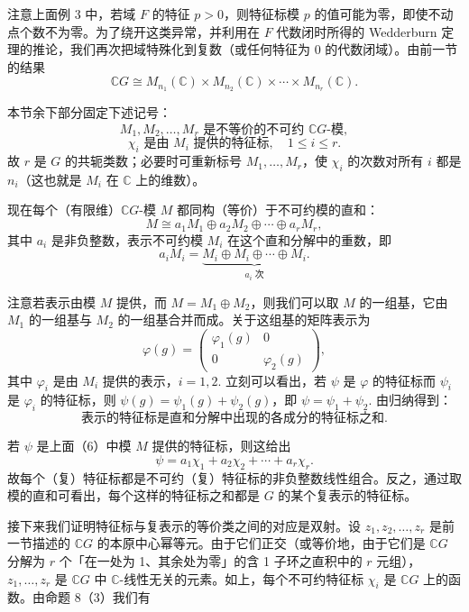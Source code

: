 注意上面例 3 中，若域 \(F\) 的特征 \(p > 0\)，则特征标模 \(p\) 的值可能为零，即使不动点个数不为零。为了绕开这类异常，并利用在 \(F\) 代数闭时所得的 Wedderburn 定理的推论，我们再次把域特殊化到复数（或任何特征为 0 的代数闭域）。由前一节的结果
\[
\mathbb{C}G \cong M_{n_1}(\mathbb{C}) \times M_{n_2}(\mathbb{C}) \times \cdots \times M_{n_r}(\mathbb{C}). \tag{18.4}
\]

本节余下部分固定下述记号：
\[
M_1, M_2, \ldots, M_r \text{ 是不等价的不可约 } \mathbb{C}G\text{-模}, \tag{18.5}
\]
\[
\chi_i \text{ 是由 } M_i \text{ 提供的特征标}, \quad 1 \leq i \leq r.
\]
故 \(r\) 是 \(G\) 的共轭类数；必要时可重新标号 \(M_1, \ldots, M_r\)，使 \(\chi_i\) 的次数对所有 \(i\) 都是 \(n_i\)（这也就是 \(M_i\) 在 \(\mathbb{C}\) 上的维数）。

现在每个（有限维）\(\mathbb{C}G\)-模 \(M\) 都同构（等价）于不可约模的直和：
\[
M \cong a_1M_1 \oplus a_2M_2 \oplus \cdots \oplus a_rM_r, \tag{18.6}
\]
其中 \(a_i\) 是非负整数，表示不可约模 \(M_i\) 在这个直和分解中的重数，即
\[
a_iM_i = \underbrace{M_i \oplus M_i \oplus \cdots \oplus M_i}_{a_i \text{ 次}}.
\]

注意若表示由模 \(M\) 提供，而 \(M = M_1 \oplus M_2\)，则我们可以取 \(M\) 的一组基，它由 \(M_1\) 的一组基与 \(M_2\) 的一组基合并而成。关于这组基的矩阵表示为
\[
\varphi(g) = \begin{pmatrix}\varphi_1(g) & 0\\ 0 & \varphi_2(g)\end{pmatrix},
\]
其中 \(\varphi_i\) 是由 \(M_i\) 提供的表示，\(i = 1, 2\). 立刻可以看出，若 \(\psi\) 是 \(\varphi\) 的特征标而 \(\psi_i\) 是 \(\varphi_i\) 的特征标，则 \(\psi(g) = \psi_1(g)+\psi_2(g)\)，即 \(\psi = \psi_1+\psi_2\). 由归纳得到：
\[
\text{表示的特征标是直和分解中出现的各成分的特征标之和}. \tag{18.7}
\]

若 \(\psi\) 是上面（6）中模 \(M\) 提供的特征标，则这给出
\[
\psi = a_1\chi_1+a_2\chi_2+\cdots+a_r\chi_r. \tag{18.8}
\]
故每个（复）特征标都是不可约（复）特征标的非负整数线性组合。反之，通过取模的直和可看出，每个这样的特征标之和都是 \(G\) 的某个复表示的特征标。

接下来我们证明特征标与复表示的等价类之间的对应是双射。设 \(z_1, z_2, \ldots, z_r\) 是前一节描述的 \(\mathbb{C}G\) 的本原中心幂等元。由于它们正交（或等价地，由于它们是 \(\mathbb{C}G\) 分解为 \(r\) 个「在一处为 1、其余处为零」的含 1 子环之直积中的 \(r\) 元组），\(z_1, \ldots, z_r\) 是 \(\mathbb{C}G\) 中 \(\mathbb{C}\)-线性无关的元素。如上，每个不可约特征标 \(\chi_i\) 是 \(\mathbb{C}G\) 上的函数。由命题 8（3）我们有


